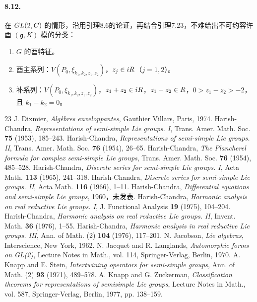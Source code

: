 \paragraph*{8.12.} 在 $GL(2,C)$ 的情形，沿用引理8.6的论证，再结合引理7.23，不难给出不可约容许酉 $(\mathfrak g,K)$ 模的分类：
\begin{enumerate}
\item[(I)] $G$ 的酉特征。
\item[(II)] 酉主系列：$V(P_0,\xi_{k_1,k_2,z_1,z_2})$，$z_j\in iR$（$j=1,2$）。
\item[(III)] 补系列：$V(P_0,\xi_{k_1,k_2,z_1,z_2})$，$z_1+z_2\in iR$，$z_1-z_2\in R$，$0>z_1-z_2>-2$，且 $k_1-k_2=0$。
\end{enumerate}

\begin{thebibliography}{23}
 J. Dixmier, \textit{Algèbres enveloppantes}, Gauthier Villars, Paris, 1974.
 Harish-Chandra, \textit{Representations of semi-simple Lie groups. I}, Trans. Amer. Math. Soc. \textbf{75} (1953), 185--243.
 Harish-Chandra, \textit{Representations of semi-simple Lie groups. II}, Trans. Amer. Math. Soc. \textbf{76} (1954), 26--65.
 Harish-Chandra, \textit{The Plancherel formula for complex semi-simple Lie groups}, Trans. Amer. Math. Soc. \textbf{76} (1954), 485--528.
 Harish-Chandra, \textit{Discrete series for semi-simple Lie groups. I}, Acta Math. \textbf{113} (1965), 241--318.
 Harish-Chandra, \textit{Discrete series for semi-simple Lie groups. II}, Acta Math. \textbf{116} (1966), 1--11.
 Harish-Chandra, \textit{Differential equations and semi-simple Lie groups}, 1960，未发表.
 Harish-Chandra, \textit{Harmonic analysis on real reductive Lie groups. I}, J. Functional Analysis \textbf{19} (1975), 104--204.
 Harish-Chandra, \textit{Harmonic analysis on real reductive Lie groups. II}, Invent. Math. \textbf{36} (1976), 1--55.
 Harish-Chandra, \textit{Harmonic analysis in real reductive Lie groups. III}, Ann. of Math. (2) \textbf{104} (1976), 117--201.
 N. Jacobson, \textit{Lie algebras}, Interscience, New York, 1962.
 N. Jacquet and R. Langlands, \textit{Automorphic forms on GL(2)}, Lecture Notes in Math., vol. 114, Springer-Verlag, Berlin, 1970.
 A. Knapp and E. Stein, \textit{Intertwining operators for semi-simple groups}, Ann. of Math. (2) \textbf{93} (1971), 489--578.
 A. Knapp and G. Zuckerman, \textit{Classification theorems for representations of semisimple Lie groups}, Lecture Notes in Math., vol. 587, Springer-Verlag, Berlin, 1977, pp. 138--159.

\end{thebibliography}
